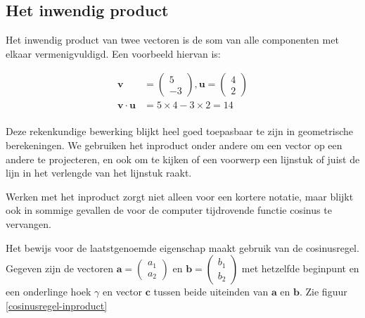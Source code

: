 \documentclass[12pt,a4paper]{article}
\begin{document}
	\subsection{Het inwendig product}
	Het inwendig product van twee vectoren is de som van alle componenten met elkaar vermenigvuldigd. Een voorbeeld hiervan is:
	
	\begin{equation*}
		\begin{aligned}
			\mathbf{v} &= \begin{pmatrix} 5 \\ -3 \end{pmatrix}, \mathbf{u} = \begin{pmatrix} 4 \\ 2 \end{pmatrix} \\
			\mathbf{v} \cdot \mathbf{u} &= 5 \times 4 -3 \times 2 = 14\\
		\end{aligned}
	\end{equation*}
	
	Deze rekenkundige bewerking blijkt heel goed toepasbaar te zijn in geometrische berekeningen. We gebruiken het inproduct onder andere om een vector op een andere te projecteren, en ook om te kijken of een voorwerp een lijnstuk of juist de lijn in het verlengde van het lijnstuk raakt.

	Werken met het inproduct zorgt niet alleen voor een kortere notatie, maar blijkt ook in sommige gevallen de voor de computer tijdrovende functie cosinus te vervangen.
	
	Het bewijs voor de laatstgenoemde eigenschap maakt gebruik van de cosinusregel. Gegeven zijn de vectoren $\mathbf{a}=\begin{pmatrix} a_1 \\ a_2 \end{pmatrix}$ en $\mathbf{b}=\begin{pmatrix} b_1 \\ b_2 \end{pmatrix}$ met hetzelfde beginpunt en een onderlinge hoek $\gamma$ en vector $\mathbf{c}$ tussen beide uiteinden van $\mathbf{a}$ en $\mathbf{b}$. Zie figuur \ref{cosinusregel-inproduct}
	
\end{document}
